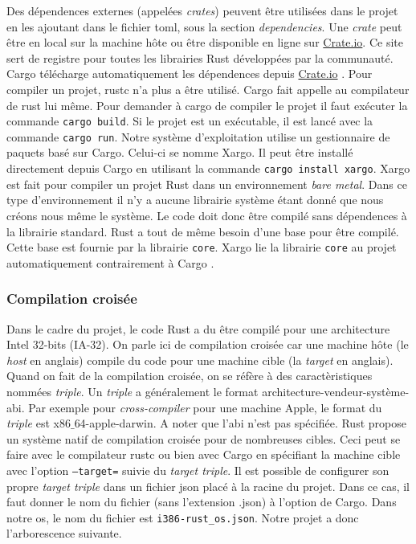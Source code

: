 Des dépendences externes (appelées \textit{crates}) peuvent être utilisées dans
le projet en les ajoutant dans le fichier \acrshort{toml}, sous la section \textit{dependencies}.
Une \textit{crate} peut être en local sur la machine hôte ou être disponible en ligne
sur \href{https://crates.io}{Crate.io}. Ce site sert de registre pour toutes les
librairies Rust développées par la communauté. Cargo télécharge automatiquement
les dépendences depuis \href{https://crates.io}{Crate.io} \cite{ref2}. Pour compiler un projet,
rustc n'a plus a être utilisé. Cargo fait appelle au compilateur
de rust lui même. Pour demander à cargo de compiler le projet il faut exécuter
la commande \texttt{cargo build}. Si le projet est un exécutable,
il est lancé avec la commande \texttt{cargo run}. Notre système
d'exploitation utilise un gestionnaire de paquets basé sur Cargo. Celui-ci
se nomme Xargo. Il peut être installé directement depuis Cargo en utilisant
la commande \texttt{cargo install xargo}. Xargo est fait pour compiler
un projet Rust dans un environnement \textit{bare metal}. Dans ce type d'environnement
il n'y a aucune librairie système étant donné que nous créons nous même le système.
Le code doit donc être compilé sans dépendences à la librairie standard. Rust a tout
de même besoin d'une base pour être compilé. Cette base est fournie par la librairie
\texttt{core}. Xargo lie la librairie \texttt{core} au projet
automatiquement contrairement à Cargo \cite{ref8}.


\subsubsection{Compilation croisée}
Dans le cadre du projet, le code Rust a du être compilé pour une architecture
Intel 32-bits (\acrshort{IA-32}). On parle ici de compilation croisée
car une machine hôte (le \textit{host} en anglais) compile du code pour une
machine cible (la \textit{target} en anglais). Quand on fait de la compilation
croisée, on se réfère à des caractèristiques nommées \textit{triple}. Un \textit{triple}
a généralement le format architecture-vendeur-système-\acrshort{abi}. Par exemple
pour \textit{cross-compiler} pour une machine Apple, le format du \textit{triple}
est x86$\_$64-apple-darwin. A noter que l'\acrshort{abi} n'est pas spécifiée.
Rust propose un système natif de compilation croisée pour de nombreuses cibles.
Ceci peut se faire avec le compilateur rustc ou bien avec Cargo en spécifiant
la machine cible avec l'option \texttt{--target=} suivie du
\textit{target triple}. Il est possible de configurer son propre \textit{target triple}
dans un fichier \acrshort{json} placé à la racine du projet. Dans ce cas, il
faut donner le nom du fichier (sans l'extension .json) à l'option de Cargo.
Dans notre \acrshort{os}, le nom du fichier est \texttt{i386-rust_os.json}.
Notre projet a donc l'arborescence suivante. \\

